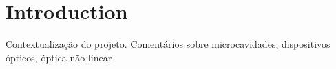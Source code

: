 \chapter{Introduction}
Contextualização do projeto. Comentários sobre microcavidades, dispositivos ópticos, óptica não-linear